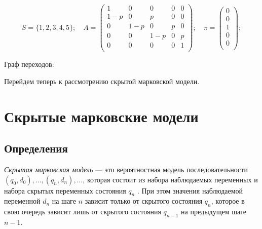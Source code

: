 \documentclass[letterpaper, 11pt]{article}
\begin{document}
$$S=\{1,2,3,4,5\};\quad
A=
\begin{pmatrix}
1 & 0 & 0 & 0 & 0\\
1-p & 0 & p & 0 & 0\\
0 & 1-p & 0 & p & 0\\
0 & 0 & 1-p & 0 & p\\
0 & 0 & 0 & 0 & 1\\
\end{pmatrix};
\quad
\pi=
\begin{pmatrix}
0\\
0\\
1\\
0\\
0\\
\end{pmatrix};
$$

Граф переходов:

\begin{center}
\end{center}


Перейдем теперь к рассмотрению скрытой марковской модели.

\section{Скрытые марковские модели}

\subsection{Определения}

\textit{Скрытая марковская модель} — это вероятностная модель последовательности $(q_0, d_0), \ldots,(q_n,d_n),\ldots$, которая состоит из набора наблюдаемых переменных и набора скрытых переменных состояния $q_n$ . При этом значения наблюдаемой переменной $d_n$ на шаге $n$ зависит только от скрытого состояния $q_n$, которое в свою очередь зависит лишь от скрытого состояния $q_{n-1}$ на предыдущем шаге $n-1$.
\end{document}
